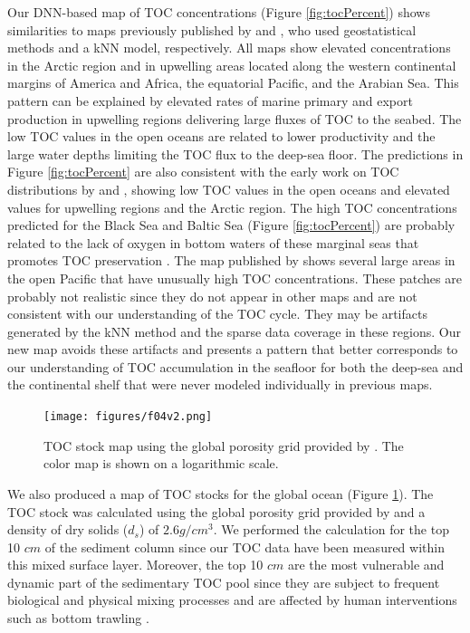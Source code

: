\documentclass[journal abbreviation, manuscript]{copernicus}
\begin{document}
Our DNN-based map of TOC concentrations (Figure \ref{fig:tocPercent}) shows similarities to maps previously published by \cite{SEITER20042001} and \cite{LeeTOCkNN}, who used geostatistical methods and a kNN model, respectively. All maps show elevated concentrations in the Arctic region and in upwelling areas located along the western continental margins of America and Africa, the equatorial Pacific, and the Arabian Sea. This pattern can be explained by elevated rates of marine primary and export production in upwelling regions delivering large fluxes of TOC to the seabed. The low TOC values in the open oceans are related to lower productivity and the large water depths limiting the TOC flux to the deep-sea floor. The predictions in Figure \ref{fig:tocPercent} are also consistent with the early work on TOC distributions by \cite{Berner1982} and \cite{Emerson1988}, showing low TOC values in the open oceans and elevated values for upwelling regions and the Arctic region. The high TOC concentrations predicted for the Black Sea and Baltic Sea (Figure \ref{fig:tocPercent}) are probably related to the lack of oxygen in bottom waters of these marginal seas that promotes TOC preservation \citep{HEDGES199581}. The map published by \cite{LeeTOCkNN} shows several large areas in the open Pacific that have unusually high TOC concentrations.  These patches are probably not realistic since they do not appear in other maps and are not consistent with our understanding of the TOC cycle. They may be artifacts generated by the kNN method and the sparse data coverage in these regions. Our new map avoids these artifacts and presents a pattern that better corresponds to our understanding of TOC accumulation in the seafloor for both the deep-sea and the continental shelf that were never modeled individually in previous maps.  


\begin{figure}
        \centering
	        \texttt{[image: figures/f04v2.png]}
        \caption{TOC stock map using the global porosity grid provided by \cite{Martin2005Porosity}. The color map is shown on a logarithmic scale.}
        \label{fig:tocStock}
\end{figure}

We also produced a map of TOC stocks for the global ocean (Figure \ref{fig:tocStock}). The TOC stock was calculated using the global porosity grid provided by \cite{Martin2005Porosity} and a density of dry solids ($d_s$) of $2.6 g/cm^3$. We performed the calculation for the top 10 $cm$ of the sediment column since our TOC data have been measured within this mixed surface layer. Moreover, the top 10 $cm$ are the most vulnerable and dynamic part of the sedimentary TOC pool since they are subject to frequent biological and physical mixing  processes \citep{song2022global} and are affected by human interventions such as bottom trawling \citep{Sala2021}.
\end{document}
